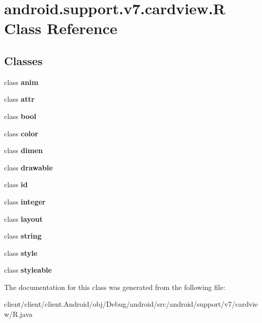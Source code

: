 \hypertarget{classandroid_1_1support_1_1v7_1_1cardview_1_1R}{}\section{android.\+support.\+v7.\+cardview.\+R Class Reference}
\label{classandroid_1_1support_1_1v7_1_1cardview_1_1R}
\subsection*{Classes}
\begin{DoxyCompactItemize}
\item 
class {\bfseries anim}
\item 
class {\bfseries attr}
\item 
class {\bfseries bool}
\item 
class {\bfseries color}
\item 
class {\bfseries dimen}
\item 
class {\bfseries drawable}
\item 
class {\bfseries id}
\item 
class {\bfseries integer}
\item 
class {\bfseries layout}
\item 
class {\bfseries string}
\item 
class {\bfseries style}
\item 
class {\bfseries styleable}
\end{DoxyCompactItemize}


The documentation for this class was generated from the following file\+:\begin{DoxyCompactItemize}
\item 
client/client/client.\+Android/obj/\+Debug/android/src/android/support/v7/cardview/R.\+java\end{DoxyCompactItemize}
